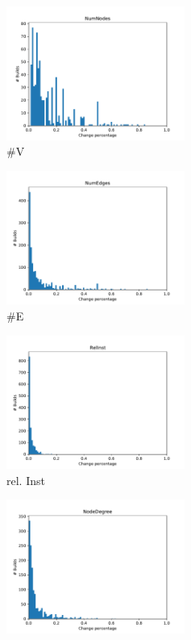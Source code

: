 \documentclass[sigconf, anonymous, review]{acmart}
\begin{document}
\begin{figure}[!t]
	\centering
	\begin{subfigure}{2.3in}
		\centering
		\includegraphics[width=2.3in]{assets/NumNodes.pdf}
		\caption{\#V}
		\label{numNodesHist}
	\end{subfigure}%
	\begin{subfigure}{2.3in}
		\centering
		\includegraphics[width=2.3in]{assets/NumEdges.pdf}
		\caption{\#E}
		\label{numEdgesHist}
	\end{subfigure}%
	\begin{subfigure}{2.3in}
		\centering
		\includegraphics[width=2.3in]{assets/RelInst.pdf}
		\caption{rel. Inst}
		\label{relInstHist}
	\end{subfigure}
	\begin{subfigure}{2.3in}
		\centering
		\includegraphics[width=2.3in]{assets/NodeDegree.pdf}

\end{subfigure}
\end{figure}
\end{document}
